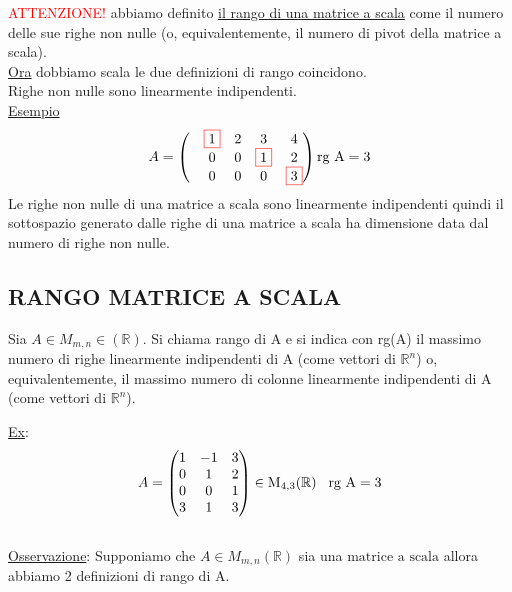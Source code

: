 \textcolor{red}{ATTENZIONE!} \textsf{\small abbiamo definito \underline{il rango di una matrice a scala} come il numero delle sue righe non nulle (o, equivalentemente, il numero di pivot della matrice a scala).}\\
\textsf{\small \underline{\underline{Ora}} $\boxed{\text{dobbiamo}}$ scala le due definizioni di rango coincidono.}\\
\textsf{\small Righe non nulle sono linearmente indipendenti.}\\
\textsf{\small \underline{Esempio}}\\
\[
A =
\begin{pmatrix}
	&\color{red}\boxed{\normalcolor 1}\normalcolor &2 &3 &4 \\
	&0 &0 &\color{red}\boxed{\normalcolor 1}\normalcolor &2 \\
	&0 &0 &0 &\color{red}\boxed{\normalcolor 3}\normalcolor
\end{pmatrix}
\text{rg A} = 3
\]
\textsf{\small Le righe non nulle di una matrice a scala sono linearmente indipendenti quindi il sottospazio generato dalle righe di una matrice a scala ha dimensione data dal numero di righe non nulle.}\\


\subsection{RANGO MATRICE A SCALA}

\begin{definition}
	Sia $A \in M_{m,n} \in (\mathbb{R})$. Si chiama rango di A e si indica con rg(A) il massimo numero di righe linearmente indipendenti di A (come vettori di $\mathbb{R}^n$) o, equivalentemente, il massimo numero di colonne linearmente indipendenti di A (come vettori di $\mathbb{R}^n$).\\
\end{definition}

\textsf{\small \underline{Ex}:}\\
\[
A =
\begin{pmatrix}
	1 & -1  &  3\\
	0 & 1  &  2\\
	0 & 0  &  1\\
	3 & 1  &  3\\
\end{pmatrix}
\in \text{M}_{4,3}(\mathbb{R}) \hspace{0.3cm} \text{rg A} = 3
\]\\
\enlargethispage{1\linewidth}
\textsf{\small \underline{Osservazione}: Supponiamo che $A \in M_{m,n} (\mathbb{R})$ sia una $\boxed{\text{matrice a scala}}$ allora abbiamo 2 definizioni di rango di A.}\\


